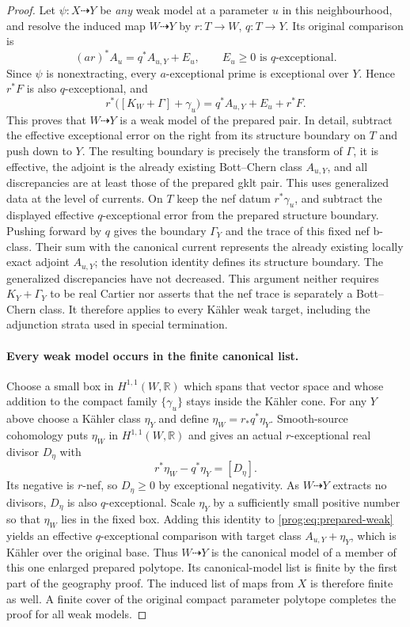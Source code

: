 \begin{proof}
Let $\psi:X\dashrightarrow Y$ be \emph{any} weak model at a parameter
$u$ in this neighbourhood, and resolve the induced map $W\dashrightarrow
Y$ by $r:T\to W$, $q:T\to Y$. Its original comparison is
\[
              (ar)^*A_u=q^*A_{u,Y}+E_u,
              \qquad E_u\geq0\text{ is }q\text{-exceptional}.
\]
Since $\psi$ is nonextracting, every $a$-exceptional prime is exceptional
over $Y$. Hence $r^*F$ is also $q$-exceptional, and
\begin{equation}\label{prog:eq:prepared-weak}
 r^*\bigl([K_W+\Gamma]+\gamma_u\bigr)
       =q^*A_{u,Y}+E_u+r^*F.
\end{equation}
This proves that $W\dashrightarrow Y$ is a weak model of the prepared
pair. In detail, subtract the effective exceptional error on the right
from its structure boundary on $T$ and push down to $Y$. The resulting
boundary is precisely the transform of $\Gamma$, it is effective, the
adjoint is the already existing Bott--Chern class $A_{u,Y}$, and all
discrepancies are at least those of the prepared gklt pair. This uses generalized data at the level of currents. On $T$ keep
the nef datum $r^*\gamma_u$, and subtract the displayed effective
$q$-exceptional error from the prepared structure boundary. Pushing
forward by $q$ gives the boundary $\Gamma_Y$ and the trace of this
fixed nef b-class. Their sum with the canonical current represents
the already existing locally exact adjoint $A_{u,Y}$; the resolution
identity defines its structure boundary. The generalized discrepancies
have not decreased. This argument neither requires $K_Y+\Gamma_Y$ to
be real Cartier nor asserts that the nef trace is separately a
Bott--Chern class. It therefore applies to every K\"ahler weak target,
including the adjunction strata used in special termination.

\paragraph{Every weak model occurs in the finite canonical list.}
Choose a small box in $H^{1,1}(W,\mathbb R)$ which spans that vector
space and whose addition to the compact family $\{\gamma_u\}$ stays
inside the K\"ahler cone. For any $Y$ above choose a K\"ahler class
$\eta_Y$ and define $\eta_W=r_*q^*\eta_Y$. Smooth-source cohomology
puts $\eta_W$ in $H^{1,1}(W,\mathbb R)$ and gives an actual
$r$-exceptional real divisor $D_\eta$ with
\[
                    r^*\eta_W-q^*\eta_Y=[D_\eta].
\]
Its negative is $r$-nef, so $D_\eta\geq0$ by exceptional negativity.
As $W\dashrightarrow Y$ extracts no divisors, $D_\eta$ is also
$q$-exceptional. Scale $\eta_Y$ by a sufficiently small positive number
so that $\eta_W$ lies in the fixed box. Adding this identity to
\eqref{prog:eq:prepared-weak} yields an effective
$q$-exceptional comparison with target class $A_{u,Y}+\eta_Y$, which
is K\"ahler over the original base. Thus $W\dashrightarrow Y$ is the
canonical model of a member of this one enlarged prepared polytope.
Its canonical-model list is finite by the first part of the geography
proof. The induced list of maps from $X$ is therefore finite as well.
A finite cover of the original compact parameter polytope completes
the proof for all weak models.

\end{proof}
